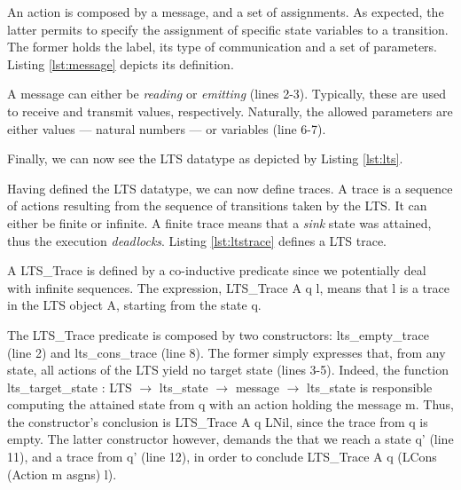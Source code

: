 	\noindent An \textsf{action} is composed by a \textsf{message}, and a set of \textsf{assignments}.
	As expected, the latter permits to specify the assignment of specific state variables to a \textsf{transition}.
	The former holds the label, its type of communication and a set of parameters. Listing \ref{lst:message}
	depicts its definition.
	
				

	\noindent A message can either be \textit{reading} or \textit{emitting} (lines 2-3). Typically, these
	are used to receive and transmit values, respectively. Naturally, the allowed \textsf{parameters} are
	either values --- natural numbers --- or variables (line 6-7).
	
	
	Finally, we can now see the \textsf{LTS} datatype as depicted by Listing \ref{lst:lts}.	
		
		

	Having defined the \textsf{LTS} datatype, we can now define \textsf{traces}. A trace is a sequence of actions 
	resulting from the sequence of \textsf{transitions} taken by the \textsf{LTS}. It can either be finite or
	infinite. A finite trace means that a \textit{sink} state was attained, thus the execution \textit{deadlocks}.
	Listing \ref{lst:ltstrace} defines a \textsf{LTS} trace.	
	
	
			


	\noindent A \textsf{LTS\_Trace} is defined by a co-inductive predicate since we potentially deal
	with infinite sequences. The expression, \textsf{LTS\_Trace A q l}, means that \textsf{l} is a trace
	in the \textsf{LTS} object \textsf{A}, starting from the state \textsf{q}.   

		The \textsf{LTS\_Trace} predicate is composed by two constructors: \textsf{lts\_empty\_trace} (line 2)
	and \textsf{lts\_cons\_trace} (line 8).  The former simply expresses that, from any state, 
	all \textsf{actions} of the \textsf{LTS} yield no target state (lines 3-5). Indeed, the
	function 
	\textsf{lts\_target\_state : LTS $\rightarrow$ lts\_state $\rightarrow$ message $\rightarrow$ lts\_state}
	is responsible computing the attained state from \textsf{q} with an \textsf{action} holding the message
	\textsf{m}. Thus, the constructor's conclusion is \textsf{LTS\_Trace A q LNil}, since the trace from \textsf{q}
	is empty.	The latter constructor however, demands the that we reach a state \textsf{q'} (line 11), and
	a trace from \textsf{q'} (line 12), in order to conclude \textsf{LTS\_Trace A q (LCons (Action m asgns) l)}.
		
